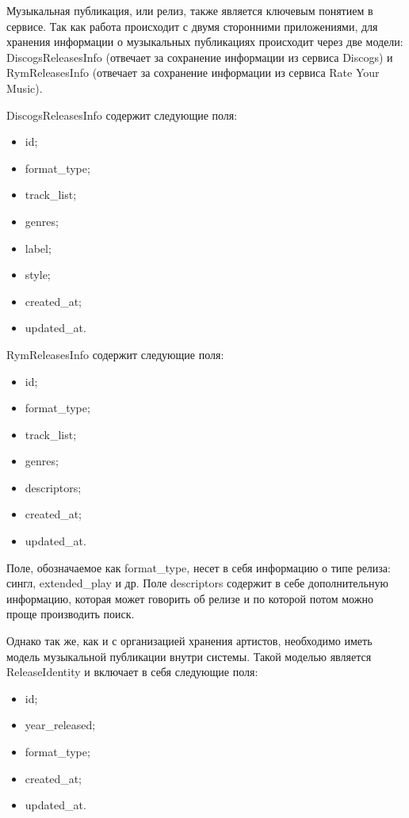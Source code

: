 Музыкальная публикация, или релиз, также является ключевым понятием в сервисе. Так как работа происходит с двумя сторонними приложениями, для хранения информации о музыкальных публикациях происходит через две модели: DiscogsReleasesInfo (отвечает за сохранение информации из сервиса Discogs) и RymReleasesInfo (отвечает за сохранение информации из сервиса Rate Your Music).

DiscogsReleasesInfo содержит следующие поля:

\begin{itemize}
  \item id;
  \item format\_type;
  \item track\_list;
  \item genres;
  \item label;
  \item style;
  \item created\_at;
  \item updated\_at.
\end{itemize}

RymReleasesInfo содержит следующие поля:

\begin{itemize}
  \item id;
  \item format\_type;
  \item track\_list;
  \item genres;
  \item descriptors;
  \item created\_at;
  \item updated\_at.
\end{itemize}

Поле, обозначаемое как format\_type, несет в себя информацию о типе релиза: сингл, extended\_play и др. Поле descriptors содержит в себе дополнительную информацию, которая может говорить об релизе и по которой потом можно проще производить поиск.

Однако так же, как и с организацией хранения артистов, необходимо иметь модель музыкальной публикации внутри системы. Такой моделью является ReleaseIdentity и включает в себя следующие поля:

\begin{itemize}
  \item id;
  \item year\_released;
  \item format\_type;
  \item created\_at;
  \item updated\_at.
\end{itemize}

